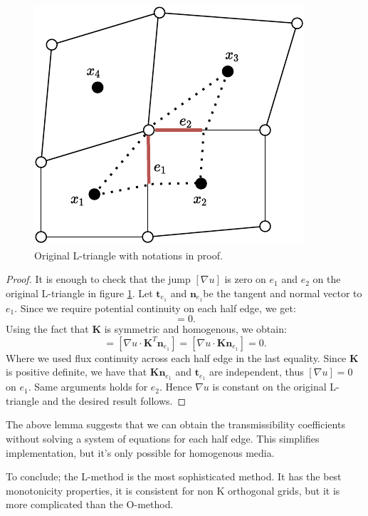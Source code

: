 \documentclass[../Main/main.tex]{subfiles}
\begin{document}
	\begin{figure}[H]
		\centering
		\includegraphics{right choice 2.pdf}	
		\caption{Original L-triangle with notations in proof.}
		\label{fig:original right choice}
	\end{figure}
	\begin{proof}
		It is enough to check that the jump $[\nabla u]$ is zero on $e_1$ and $e_2$ on the original L-triangle in figure \ref{fig:original right choice}. Let $\bm{t}_{e_1}$ and $\bm{n}_{e_1} $be the tangent and normal vector to $e_1$. Since we require potential continuity on each half edge, we get:
		\begin{equation}
			[\nabla u \cdot \bm{t}_{e_1}]=0.
		\end{equation}
		Using the fact that $\bm{K}$ is symmetric and homogenous, we obtain:
		\begin{equation}
			[\bm{K} \nabla u \cdot \bm{n}_{e_1}]=[\nabla u \cdot \bm{K}^T \bm{n}_{e_1}]=[\nabla u \cdot \bm{K}\bm{n}_{e_1}]=0.
		\end{equation}
		Where we used flux continuity across each half edge in the last equality. Since $\bm{K}$ is positive definite, we have that $\bm{K}\bm{n}_{e_1}$ and $\bm{t}_{e_1}$ are independent, thus $[\nabla u]=0$ on $e_1$. Same arguments holds for $e_2$. Hence $\nabla u$ is constant on the original L-triangle and the desired result follows.
	\end{proof}
	\begin{remark}
		The above lemma suggests that we can obtain the transmissibility coefficients without solving a system of equations for each half edge. This simplifies implementation, but it's only possible for homogenous media.
	\end{remark}
	\par 
	To conclude; the L-method is the most sophisticated method. It has the best monotonicity properties, it is consistent for non K orthogonal grids, but it is more complicated than the O-method. 
\end{document}
